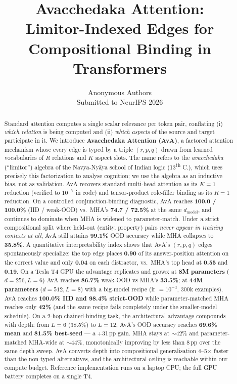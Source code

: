 \documentclass{article}
\title{Avacchedaka Attention:\\
Limitor-Indexed Edges for Compositional Binding in Transformers}
\author{%
  Anonymous Authors \\
  Submitted to NeurIPS 2026
}
\date{}
\begin{document}
\maketitle

\begin{abstract}
Standard attention computes a single scalar relevance per token pair,
conflating (i) \emph{which relation} is being computed and (ii)
\emph{which aspects} of the source and target participate in it. We
introduce \textbf{Avacchedaka Attention (AvA)}, a factored attention
mechanism whose every edge is typed by a triple $(r, p, q)$ drawn from
learned vocabularies of $R$ relations and $K$ aspect slots. The
name refers to the \emph{avacchedaka} (``limitor'') algebra of the
Navya-Ny\=aya school of Indian logic (13\textsuperscript{th} C.), which
uses precisely this factorization to analyse cognition; we use the
algebra as an inductive bias, not as validation.
%
AvA recovers standard multi-head attention as its $K{=}1$ reduction
(verified to $10^{-7}$ in code) and tensor-product role-filler binding
as its $R{=}1$ reduction. On a controlled conjunction-binding
diagnostic, AvA reaches \textbf{100.0 / 100.0\%} (IID / weak-OOD)
vs.\ MHA's \textbf{74.7 / 72.5\%} at the same $d_{\text{model}}$, and
continues to dominate when MHA is widened to parameter-match.  Under a
strict compositional split where held-out (entity, property) pairs
\emph{never appear in training contexts at all}, AvA still attains
\textbf{99.1\%} OOD accuracy while MHA collapses to
\textbf{35.8\%}. A quantitative interpretability index
shows that AvA's $(r, p, q)$ edges spontaneously specialize: the top
edge places \textbf{0.90} of its answer-position attention on the
correct value and only \textbf{0.04} on each distractor, vs.\ MHA's
top head at \textbf{0.55} and \textbf{0.19}. On a Tesla T4 GPU the
advantage replicates and grows: at \textbf{8M parameters}
($d{=}256, L{=}6$) AvA reaches \textbf{86.7\%} weak-OOD vs MHA's
\textbf{33.5\%}; at \textbf{44M parameters} ($d{=}512, L{=}8$) with a
big-model recipe (lr $= 10^{-3}$, 300k examples), AvA reaches
\textbf{100.0\% IID and 98.4\% strict-OOD} while parameter-matched MHA
reaches only \textbf{42\%} (and the same recipe fails completely
under the smaller-model schedule). On a 2-hop chained-binding task,
the architectural advantage compounds with depth: from $L{=}6$
(38.5\%) to $L{=}12$, AvA's OOD accuracy reaches \textbf{69.6\% mean}
and \textbf{81.5\% best-seed} --- a +31\,pp gain. MHA stays at
$\sim$42\% and parameter-matched MHA-wide at $\sim$44\%, monotonically
improving by less than 8\,pp over the same depth sweep. AvA converts
depth into compositional generalisation 4--5$\times$ faster than the
non-typed alternatives, and the architectural ceiling is reachable
within our compute budget.
Reference implementation runs on a laptop CPU; the full
GPU battery completes on a single T4.
\end{abstract}
\end{document}
